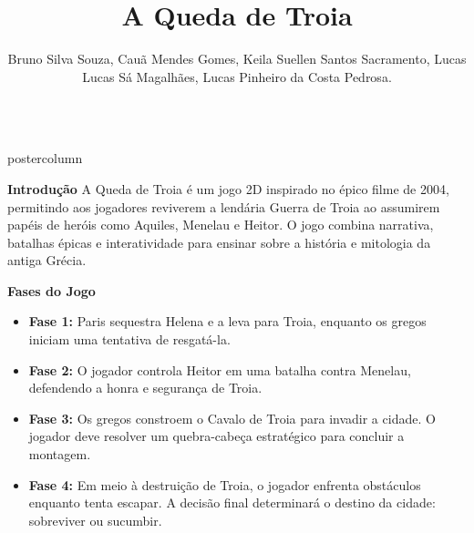 \documentclass[final,hyperref={pdfpagelabels=false}]{beamer}
\title{\Huge \textbf{A Queda de Troia}}
\author{Bruno Silva Souza, Cauã Mendes Gomes, Keila Suellen Santos Sacramento, Lucas Lucas Sá Magalhães, Lucas Pinheiro da Costa Pedrosa.}
\institute[SENAC]{Centro Universitário Senac - Campus Santo Amaro}
\newlength{\columnheight}
\begin{document}
\begin{frame}
    \vspace{1cm}
    \begin{columns}
        \begin{column}{.49\textwidth}
            \begin{beamercolorbox}[center,wd=\textwidth]{postercolumn}
                \begin{minipage}[T]{.85\textwidth} 
                    \parbox[t][\columnheight]{\textwidth}{ 
                        \begin{block}{\textbf{Introdução}}
                            A Queda de Troia é um jogo 2D inspirado no épico filme de 2004, permitindo aos jogadores reviverem a lendária Guerra de Troia ao assumirem papéis de heróis como Aquiles, Menelau e Heitor. O jogo combina narrativa, batalhas épicas e interatividade para ensinar sobre a história e mitologia da antiga Grécia.
                        \end{block}
                        
                        \begin{block}{\textbf{Fases do Jogo}}
                            \begin{itemize}
                                \item \textbf{Fase 1:} Paris sequestra Helena e a leva para Troia, enquanto os gregos iniciam uma tentativa de resgatá-la.
                                \item \textbf{Fase 2:} O jogador controla Heitor em uma batalha contra Menelau, defendendo a honra e segurança de Troia.
                                \item \textbf{Fase 3:} Os gregos constroem o Cavalo de Troia para invadir a cidade. O jogador deve resolver um quebra-cabeça estratégico para concluir a montagem.
                                \item \textbf{Fase 4:} Em meio à destruição de Troia, o jogador enfrenta obstáculos enquanto tenta escapar. A decisão final determinará o destino da cidade: sobreviver ou sucumbir.
                            \end{itemize}
                        \end{block}
                        
}
\end{minipage}
\end{beamercolorbox}
\end{column}
\end{columns}
\end{frame}
\end{document}
